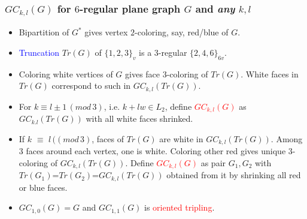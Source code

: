 \documentclass{beamer}
\begin{document}
\begin{frame}\frametitle{$GC_{k,l}(G)$ for $6$-regular plane
graph $G$ and {\em any} $k,l$}
\vspace{-2.5mm}
\begin{itemize}
\item
Bipartition of  $G^{*}$ gives vertex $2$-coloring, say, red/blue of $G$.
\item  \textcolor{blue}{Truncation} $Tr(G)$ of $\{1,2,3\}_v$ is a
$3$-regular  $\{2,4,6\}_{6v}$.
\item Coloring white vertices of $G$ gives face $3$-coloring of $Tr(G)$.
White faces in  $Tr(G)$  correspond to such in $GC_{k,l}(Tr(G))$.
\item For  $k\equiv l\pm 1\,(mod\,3)$, i.e. $k+lw\in L_2$, define \textcolor{red}{$GC_{k,l}(G)$}
as $GC_{k.l}(Tr(G))$
with all white faces shrinked.
\item If $k$ $\equiv $ $ l \,((mod\,3)$, faces of   $Tr(G)$ are  white in  $GC_{k,l}(Tr(G))$.
Among $3$ faces around each vertex, one is white. Coloring other red gives  unique $3$-coloring of 
$GC_{k,l}(Tr(G))$. 
Define 
\textcolor{red}{$GC_{k,l}(G)$}
as  pair
$G_1,G_2$
with
$Tr(G_1)$=$Tr(G_2)$=$GC_{k,l}(Tr(G))$ obtained  from it by
shrinking all red or blue faces.
\item $GC_{1,0}(G)=G$ and 
 $GC_{1,1}(G)$ is \textcolor{red}{oriented tripling}.
\end{itemize}

\end{frame}
\end{document}
